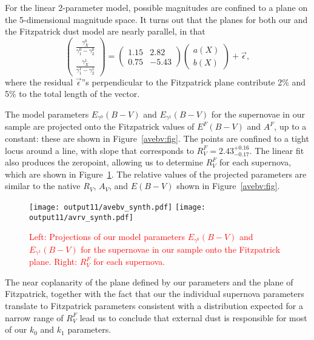 \documentclass{aastex61}   	%
\begin{document}
For the linear 2-parameter model, possible magnitudes are confined to a plane on the 5-dimensional magnitude space.
It turns out that the planes for both our and the Fitzpatrick dust model are nearly parallel, in that
\begin{equation}
\begin{pmatrix}
 \frac{\gamma^0_X}{\gamma^0_1-\gamma^0_2} \\
\frac{\gamma^1_X}{\gamma^1_1-\gamma^1_2} 
\end{pmatrix}=
\begin{pmatrix}
1.15 & 2.82 \\
0.75 & -5.43
\end{pmatrix} 
\begin{pmatrix}
a(X) \\
b(X)
\end{pmatrix}+
\vec{\epsilon},
\end{equation}
where the residual $\vec{\epsilon}$''s perpendicular to the Fitzpatrick plane
contribute  2\% and 5\% to the total  length of the vector.

The model parameters $E_{\gamma^0}(B-V)$ and  $E_{\gamma^1}(B-V)$ for the supernovae in our sample
are projected onto the Fitzpatrick values of $E^F(B-V)$ and $A^F$, up to a constant:  these are shown in Figure~\ref{avebv:fig}.
The points are confined to a tight locus around a line, with slope that corresponds to $R^F_V=2.43^{+0.16}_{-0.17}$.  
The linear fit also produces the zeropoint, allowing us to determine $R^F_V$ for each supernova,
which are shown in Figure~\ref{avebv_synth:fig}.   The relative values of the projected parameters are similar to
the native $R_V$, $A_V$, and $E(B-V)$  shown in Figure~\ref{avebv:fig}.

\begin{figure}[htbp] %
   \centering
   \texttt{[image: output11/avebv\_synth.pdf]}
   \texttt{[image: output11/avrv\_synth.pdf]}
    \caption{\textcolor{red}{Left: Projections of our model parameters $E_{\gamma^0}(B-V)$ and  $E_{\gamma^1}(B-V)$ for the supernovae in our sample
onto the Fitzpatrick plane.  Right: $R^F_V$ for each supernova.}
   \label{avebv_synth:fig}}
\end{figure}


The near coplanarity of the plane defined by our parameters and the plane of Fitzpatrick, together with the fact that our the individual supernova
parameters translate to Fitzpatrick parameters consistent with a distribution expected for a narrow range of $R^F_V$ lead us to conclude that 
external dust is responsible for most of our $k_0$ and $k_1$ parameters.
\end{document}
